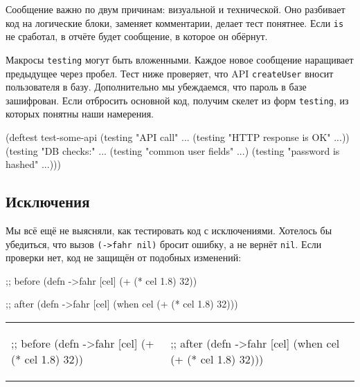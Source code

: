 Сообщение важно по двум причинам: визуальной и технической. Оно разбивает код на
логические блоки, заменяет комментарии, делает тест понятнее. Если \verb|is|
не сработал, в отчёте будет сообщение, в которое он обёрнут.

Макросы \verb|testing| могут быть вложенными. Каждое новое сообщение наращивает
предыдущее через пробел. Тест ниже проверяет, что API \verb|createUser| вносит
пользователя в базу. Дополнительно мы убеждаемся, что пароль в базе
зашифрован. Если отбросить основной код, получим скелет из форм \verb|testing|,
из которых понятны наши намерения.

\begin{english}
  \begin{clojure}
(deftest test-some-api
  (testing "API call" ...
    (testing "HTTP response is OK" ...))
  (testing "DB checks:" ...
    (testing "common user fields" ...)
    (testing "password is hashed" ...)))
  \end{clojure}
\end{english}

\subsection{Исключения}


Мы всё ещё не выясняли, как тестировать код с исключениями. Хотелось бы
убедиться, что вызов \verb|(->fahr nil)| бросит ошибку, а не вернёт
\verb|nil|. Если проверки нет, код не защищён от подобных изменений:

\ifx\DEVICETYPE\MOBILE

\begin{english}
  \begin{clojure}
;; before
(defn ->fahr [cel]
  (+ (* cel 1.8) 32))
  \end{clojure}

\splitter

  \begin{clojure}
;; after
(defn ->fahr [cel]
  (when cel
    (+ (* cel 1.8) 32)))
  \end{clojure}
\end{english}

\else

\begin{english}

\noindent
\begin{tabular}{ @{}p{5cm} @{}p{5cm} }


  \begin{clojure}
;; before
(defn ->fahr [cel]
  (+ (* cel 1.8) 32))
  \end{clojure}

&

  \begin{clojure}
;; after
(defn ->fahr [cel]
  (when cel
    (+ (* cel 1.8) 32)))
  \end{clojure}

\end{tabular}

\end{english}

